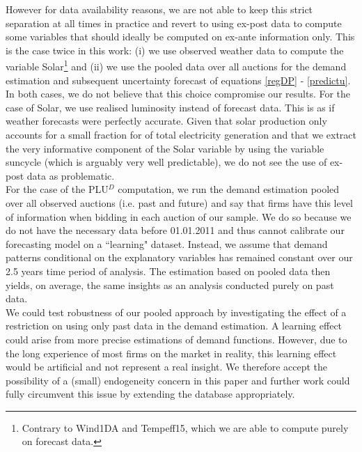 However for data availability reasons, we are not able to keep this strict separation at all times in practice and revert to using ex-post data to compute some variables that should ideally be computed on ex-ante information only. This is the case twice in this work: (i) we use observed weather data to compute the variable Solar\footnote{Contrary to Wind1DA and Tempeff15, which we are able to compute purely on forecast data.} and (ii) we use the pooled data over all auctions for the demand estimation and subsequent uncertainty forecast of equations \ref{regDP} - \ref{predictu}.\\ 

In both cases, we do not believe that this choice compromise our results.
For the case of Solar, we use realised luminosity instead of forecast data. This is as if weather forecasts were perfectly accurate. 
Given that solar production only accounts for a small fraction for of total electricity generation and that we extract the very informative component of the Solar variable by using the variable suncycle (which is arguably very well predictable), we do not see the use of ex-post data as problematic. \\

For the case of the PLU$^D$ computation, we run the demand estimation pooled over all observed auctions (i.e. past and future) and say that firms have this level of information when bidding in each auction of our sample. We do so because we do not have the necessary data before 01.01.2011 and thus cannot calibrate our forecasting model on a ``learning" dataset. Instead, we assume that demand patterns conditional on the explanatory variables has remained constant over our 2.5 years time period of analysis. The estimation based on pooled data then yields, on average, the same insights as an analysis conducted purely on past data. \\

We could test robustness of our pooled approach by investigating the effect of a restriction on using only past data in the demand estimation. A learning effect could arise from more precise estimations of demand functions. However, due to the long experience of most firms on the market in reality, this learning effect would be artificial and not represent a real insight. We therefore accept the possibility of a (small) endogeneity concern in this paper and further work could fully circumvent this issue by extending the database appropriately. \\

